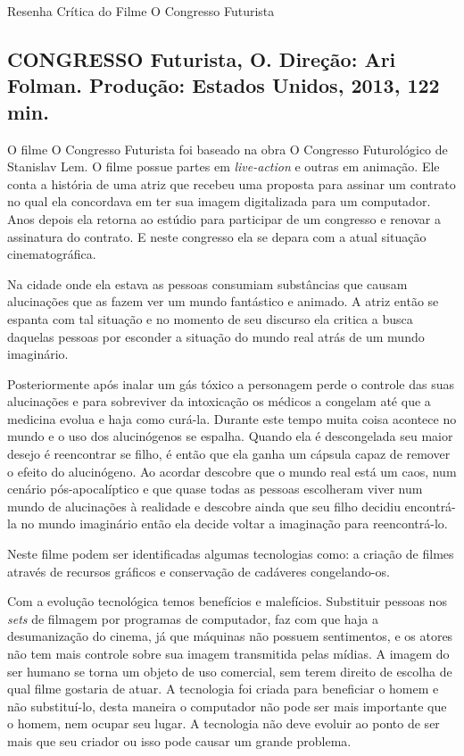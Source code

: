 \documentclass[a4paper,12pt]{article}
\begin{document}
	\LARGE
	Resenha Crítica do Filme O Congresso Futurista
	
	
	
	\large
	
	\subsection*{\textbf{CONGRESSO Futurista, O.} Direção: Ari Folman. Produção: Estados Unidos, 2013, 122 min.}
	
	O filme O Congresso Futurista foi baseado na obra O Congresso Futurológico de Stanislav Lem. O filme possue partes em \textit{live-action} e outras em animação. Ele conta a história de uma atriz que recebeu uma proposta para assinar um contrato no qual ela concordava em ter sua imagem digitalizada para um computador. Anos depois ela retorna ao estúdio para participar de um congresso e renovar a assinatura do contrato. E neste congresso ela se depara com a atual situação cinematográfica.
	
	Na cidade onde ela estava as pessoas consumiam substâncias que causam alucinações que as fazem ver um mundo fantástico e animado. A atriz então se espanta com tal situação e no momento de seu discurso ela critica a busca daquelas pessoas por esconder a situação do mundo real atrás de um mundo imaginário. 
	
	Posteriormente após inalar um gás tóxico a personagem perde o controle das suas alucinações e para sobreviver da intoxicação os médicos a congelam até que a medicina evolua e haja como curá-la.
	Durante este tempo muita coisa acontece no mundo e o uso dos alucinógenos se espalha. Quando ela é descongelada seu maior desejo é reencontrar se filho, é então que ela ganha um cápsula capaz de remover o efeito do alucinógeno. Ao acordar descobre que o mundo real está um caos, num cenário pós-apocalíptico e que quase todas as pessoas escolheram viver num mundo de alucinações à realidade e descobre ainda que seu filho decidiu encontrá-la no mundo imaginário então ela decide voltar a imaginação para reencontrá-lo.
	
	Neste filme podem ser identificadas algumas tecnologias como: a criação de filmes através de recursos gráficos e conservação de cadáveres congelando-os. 
	
	Com a evolução tecnológica temos benefícios e malefícios. Substituir pessoas nos \textit{sets} de filmagem por programas de computador, faz com que haja a desumanização do cinema, já que máquinas não possuem sentimentos, e os atores não tem mais controle sobre sua imagem transmitida pelas mídias. A imagem do ser humano se torna um objeto de uso comercial, sem terem direito de escolha de qual filme gostaria de atuar. A tecnologia foi criada para beneficiar o homem e não substituí-lo, desta maneira o computador não pode ser mais importante que o homem, nem ocupar seu lugar. A tecnologia não deve evoluir ao ponto de ser mais que seu criador ou isso pode causar um grande problema.
	
\end{document}
